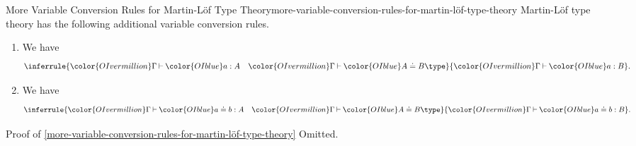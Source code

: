 \begin{proposition}{More Variable Conversion Rules for Martin-Löf Type Theory}{more-variable-conversion-rules-for-martin-löf-type-theory}%
    Martin-Löf type theory has the following additional variable conversion rules.
    \begin{enumerate}
        \item\label{more-variable-conversion-rules-for-martin-löf-type-theory-converting-terms}We have
            \[
                \inferrule{%
                    {\color{OIvermillion}\Gamma}\mathbin{\vdash}{\color{OIblue}a:A}%
                    \quad%
                    {\color{OIvermillion}\Gamma}\mathbin{\vdash}{\color{OIblue}A\doteq B\type}%
                }{%
                    {\color{OIvermillion}\Gamma}\mathbin{\vdash}{\color{OIblue}a:B}%
                }.%
            \]%
        \item\label{more-variable-conversion-rules-for-martin-löf-type-theory-converting-judgemental-equality-for-terms}We have
            \[
                \inferrule{%
                    {\color{OIvermillion}\Gamma}\mathbin{\vdash}{\color{OIblue}a\doteq b:A}%
                    \quad%
                    {\color{OIvermillion}\Gamma}\mathbin{\vdash}{\color{OIblue}A\doteq B\type}%
                }{%
                    {\color{OIvermillion}\Gamma}\mathbin{\vdash}{\color{OIblue}a\doteq b:B}%
                }.%
            \]%
    \end{enumerate}
\end{proposition}
\begin{Proof}{Proof of \cref{more-variable-conversion-rules-for-martin-löf-type-theory}}%
    Omitted.
\end{Proof}
